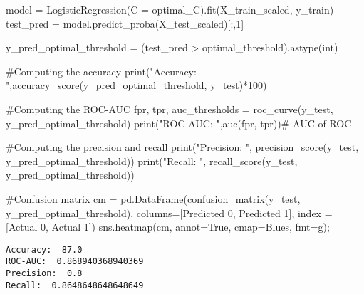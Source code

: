 \documentclass[
  letterpaper,
  DIV=11,
  numbers=noendperiod]{scrreprt}
\newenvironment{Shaded}{\begin{snugshade}}{\end{snugshade}}
\newcommand{\BuiltInTok}[1]{\textcolor[rgb]{0.00,0.23,0.31}{#1}}
\newcommand{\CommentTok}[1]{\textcolor[rgb]{0.37,0.37,0.37}{#1}}
\newcommand{\DecValTok}[1]{\textcolor[rgb]{0.68,0.00,0.00}{#1}}
\newcommand{\NormalTok}[1]{\textcolor[rgb]{0.00,0.23,0.31}{#1}}
\newcommand{\OperatorTok}[1]{\textcolor[rgb]{0.37,0.37,0.37}{#1}}
\newcommand{\StringTok}[1]{\textcolor[rgb]{0.13,0.47,0.30}{#1}}
\newcommand{\VariableTok}[1]{\textcolor[rgb]{0.07,0.07,0.07}{#1}}
\begin{document}
\begin{Shaded}
\begin{Highlighting}[]
\NormalTok{model }\OperatorTok{=}\NormalTok{ LogisticRegression(C }\OperatorTok{=}\NormalTok{ optimal\_C).fit(X\_train\_scaled, y\_train)}
\NormalTok{test\_pred }\OperatorTok{=}\NormalTok{ model.predict\_proba(X\_test\_scaled)[:,}\DecValTok{1}\NormalTok{]}

\NormalTok{y\_pred\_optimal\_threshold }\OperatorTok{=}\NormalTok{ (test\_pred }\OperatorTok{\textgreater{}}\NormalTok{ optimal\_threshold).astype(}\BuiltInTok{int}\NormalTok{)}

\CommentTok{\#Computing the accuracy}
\BuiltInTok{print}\NormalTok{(}\StringTok{"Accuracy: "}\NormalTok{,accuracy\_score(y\_pred\_optimal\_threshold, y\_test)}\OperatorTok{*}\DecValTok{100}\NormalTok{)  }

\CommentTok{\#Computing the ROC{-}AUC}
\NormalTok{fpr, tpr, auc\_thresholds }\OperatorTok{=}\NormalTok{ roc\_curve(y\_test, y\_pred\_optimal\_threshold)}
\BuiltInTok{print}\NormalTok{(}\StringTok{"ROC{-}AUC: "}\NormalTok{,auc(fpr, tpr))}\CommentTok{\# AUC of ROC}

\CommentTok{\#Computing the precision and recall}
\BuiltInTok{print}\NormalTok{(}\StringTok{"Precision: "}\NormalTok{, precision\_score(y\_test, y\_pred\_optimal\_threshold))}
\BuiltInTok{print}\NormalTok{(}\StringTok{"Recall: "}\NormalTok{, recall\_score(y\_test, y\_pred\_optimal\_threshold))}

\CommentTok{\#Confusion matrix}
\NormalTok{cm }\OperatorTok{=}\NormalTok{ pd.DataFrame(confusion\_matrix(y\_test, y\_pred\_optimal\_threshold), columns}\OperatorTok{=}\NormalTok{[}\StringTok{\textquotesingle{}Predicted 0\textquotesingle{}}\NormalTok{, }\StringTok{\textquotesingle{}Predicted 1\textquotesingle{}}\NormalTok{], }
\NormalTok{            index }\OperatorTok{=}\NormalTok{ [}\StringTok{\textquotesingle{}Actual 0\textquotesingle{}}\NormalTok{, }\StringTok{\textquotesingle{}Actual 1\textquotesingle{}}\NormalTok{])}
\NormalTok{sns.heatmap(cm, annot}\OperatorTok{=}\VariableTok{True}\NormalTok{, cmap}\OperatorTok{=}\StringTok{\textquotesingle{}Blues\textquotesingle{}}\NormalTok{, fmt}\OperatorTok{=}\StringTok{\textquotesingle{}g\textquotesingle{}}\NormalTok{)}\OperatorTok{;}
\end{Highlighting}
\end{Shaded}

\begin{verbatim}
Accuracy:  87.0
ROC-AUC:  0.868940368940369
Precision:  0.8
Recall:  0.8648648648648649
\end{verbatim}
\end{document}
